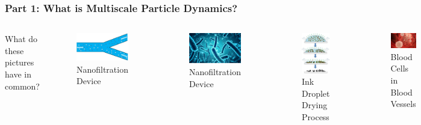 \documentclass[aspectratio=169,xcolor=dvipsnames]{beamer}
\begin{document}
\begin{frame}
	\frametitle{Part 1: What is Multiscale Particle Dynamics?}
	
	\begin{columns}
		What do these pictures have in common?\\
		
		\begin{columns}	
			\begin{figure}
				\includegraphics[width=4cm]{Microfilter.png}
				\caption{ Nanofiltration Device}
			\end{figure}
		\begin{figure}
			\includegraphics[width=4cm]{bacteria.png}
			\caption{ Nanofiltration Device}
		\end{figure}
			\begin{figure}		
				\includegraphics[width=4cm]{printing1.png}
				\caption{Ink Droplet Drying Process}
			\end{figure}
		\end{columns}
		
		\begin{figure}
			\includegraphics[width=4cm]{bloodcells.jpg}
			\caption{Blood Cells in Blood Vessels}
		\end{figure}
		\begin{figure}
			\includegraphics[width=4cm]{beer.png}
			\caption{Yeast Sedimentation in Beer}
		\end{figure}
		

\end{columns}
\end{frame}
\end{document}
